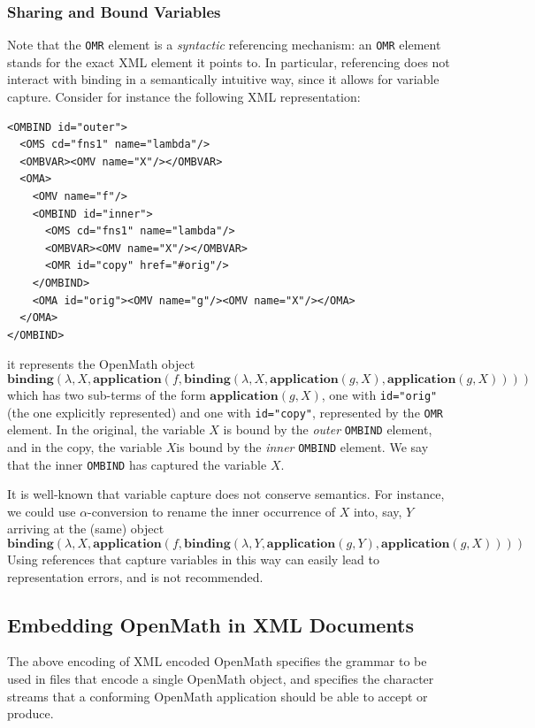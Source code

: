 \documentclass{report}
\def\OM{OpenMath\xspace}
\def\XML{XML\xspace}
\def\application#1{\mathbf{application}(#1)}
\def\binding#1{\mathbf{binding}(#1)}
\begin{document}
\subsubsection{Sharing and Bound Variables}\label{sec_sharing_bvars}

Note that the \lstinline|OMR| element is a \emph{syntactic} referencing mechanism: an
\lstinline|OMR| element stands for the exact \XML element it points to. In particular,
referencing does not interact with binding in a semantically intuitive way, since it
allows for variable capture. Consider for instance the following \XML representation:
\begin{lstlisting}
<OMBIND id="outer">
  <OMS cd="fns1" name="lambda"/>
  <OMBVAR><OMV name="X"/></OMBVAR>
  <OMA>
    <OMV name="f"/>
    <OMBIND id="inner">
      <OMS cd="fns1" name="lambda"/>
      <OMBVAR><OMV name="X"/></OMBVAR>
      <OMR id="copy" href="#orig"/>
    </OMBIND>
    <OMA id="orig"><OMV name="g"/><OMV name="X"/></OMA>
  </OMA>
</OMBIND>
\end{lstlisting}
it represents the \OM object
\[\binding{\lambda,X,\application{f,\binding{\lambda,X,\application{g,X},\application{g,X}}}}\]
which has two sub-terms of the form $\application{g,X}$, one with \lstinline|id="orig"|
(the one explicitly represented) and one with \lstinline|id="copy"|, represented by the
\lstinline|OMR| element. In the original, the variable $X$ is bound by the \emph{outer}
\lstinline|OMBIND| element, and in the copy, the variable $X$is bound by the \emph{inner}
\lstinline|OMBIND| element. We say that the inner \lstinline|OMBIND| has captured the
variable $X$.

It is well-known that variable capture does not conserve semantics. For instance, we could
use $\alpha$-conversion to rename the inner occurrence of $X$ into, say, $Y$ arriving at
the (same) object
\[\binding{\lambda,X,\application{f,\binding{\lambda,Y,\application{g,Y},\application{g,X}}}}\]
Using references that capture variables in this way can easily lead to representation
errors, and is not recommended.

\subsection{Embedding \OM in \XML Documents}\label{xmldoc}
     
The above encoding of \XML encoded \OM specifies the grammar to be used in files that
encode a single \OM object, and specifies the character streams that a conforming \OM
application should be able to accept or produce.
\end{document}
